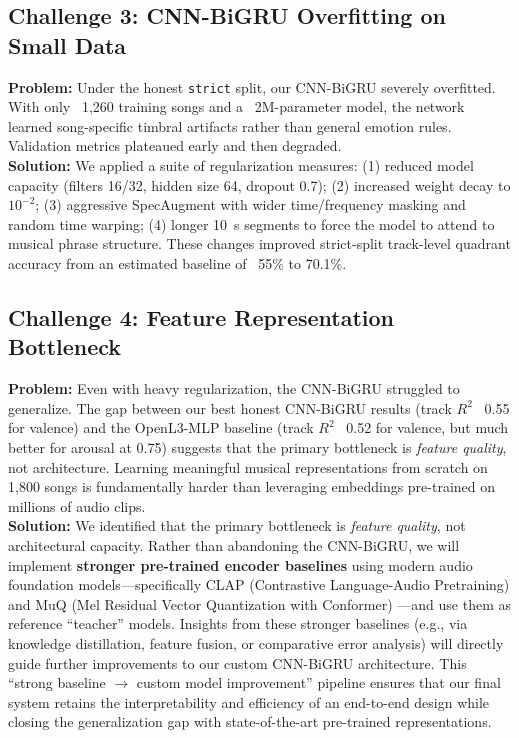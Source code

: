 \documentclass[12pt,a4paper]{article}
\begin{document}
\subsection{Challenge 3: CNN-BiGRU Overfitting on Small Data}

\textbf{Problem:} Under the honest \texttt{strict} split, our CNN-BiGRU severely overfitted. With only ~1,260 training songs and a ~2M-parameter model, the network learned song-specific timbral artifacts rather than general emotion rules. Validation metrics plateaued early and then degraded. \\

\textbf{Solution:} We applied a suite of regularization measures: (1) reduced model capacity (filters 16/32, hidden size 64, dropout 0.7); (2) increased weight decay to $10^{-2}$; (3) aggressive SpecAugment with wider time/frequency masking and random time warping; (4) longer 10~s segments to force the model to attend to musical phrase structure. These changes improved strict-split track-level quadrant accuracy from an estimated baseline of ~55\% to 70.1\%.

\subsection{Challenge 4: Feature Representation Bottleneck}

\textbf{Problem:} Even with heavy regularization, the CNN-BiGRU struggled to generalize. The gap between our best honest CNN-BiGRU results (track $R^2$ ~0.55 for valence) and the OpenL3-MLP baseline (track $R^2$ ~0.52 for valence, but much better for arousal at 0.75) suggests that the primary bottleneck is \textit{feature quality}, not architecture. Learning meaningful musical representations from scratch on 1,800 songs is fundamentally harder than leveraging embeddings pre-trained on millions of audio clips. \\

\textbf{Solution:} We identified that the primary bottleneck is \textit{feature quality}, not architectural capacity. Rather than abandoning the CNN-BiGRU, we will implement \textbf{stronger pre-trained encoder baselines} using modern audio foundation models---specifically CLAP (Contrastive Language-Audio Pretraining) \cite{clap2023} and MuQ (Mel Residual Vector Quantization with Conformer) \cite{muq2025}---and use them as reference ``teacher'' models. Insights from these stronger baselines (e.g., via knowledge distillation, feature fusion, or comparative error analysis) will directly guide further improvements to our custom CNN-BiGRU architecture. This ``strong baseline $\rightarrow$ custom model improvement'' pipeline ensures that our final system retains the interpretability and efficiency of an end-to-end design while closing the generalization gap with state-of-the-art pre-trained representations.
\end{document}
